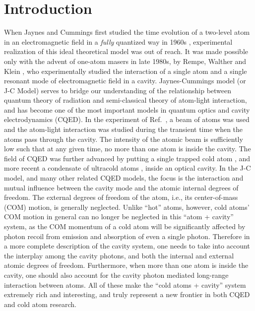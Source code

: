 \documentclass[atoms,article,submit,moreauthors,pdftex,12pt,a4paper]{mdpi}
\begin{document}

\section{Introduction}

When Jaynes and Cummings first studied the time evolution of a two-level atom in an electromagnetic field in a {\em fully} quantized way in 1960s \cite{JCM}, experimental realization of this ideal theoretical model was out of reach. It was made possible only with the advent of one-atom masers in late 1980s, by Rempe, Walther and Klein \cite{exp1987}, who experimentally studied the interaction of a single atom and a single resonant mode of electromagnetic field in a cavity. Jaynes-Cummings model (or J-C Model) serves to bridge our understanding of the relationship between quantum theory of radiation and semi-classical theory of atom-light interaction, and has become one of the most important models in quantum optics and cavity electrodynamics (CQED). 
In the experiment of Ref.~\cite{exp1987}, a beam of atoms was used and the atom-light interaction was studied during the transient time when the atoms pass through the cavity. The intensity of the atomic beam is sufficiently low such that at any given time, no more than one atom is inside the cavity.
The field of CQED was further advanced by putting a single trapped cold atom \cite{cavity0}, and more recent a condensate of ultracold atoms \cite{cavity1, cavity2, cavity3,Esslinger2010}, inside an optical cavity. In the J-C model, and many other related CQED models, the focus is the interaction and mutual influence between the cavity mode and the atomic internal degrees of freedom. The external degrees of freedom of the atom, i.e., its center-of-mass (COM) motion, is generally neglected. Unlike ``hot'' atoms, however, cold atoms' COM motion in general can no longer be neglected in this ``atom + cavity'' system, as the COM momentum of a cold atom will be significantly affected by photon recoil from emission and absorption of even a single photon. Therefore in a more complete description of the cavity system, one needs to take into account the interplay among the cavity photons, and both the internal and external atomic degrees of freedom. Furthermore, when more than one atom is inside the cavity, one should also account for the cavity photon mediated long-range interaction between atoms. All of these make the ``cold atoms + cavity'' system extremely rich and interesting, and truly represent a new frontier in both CQED and cold atom research. 
\end{document}
